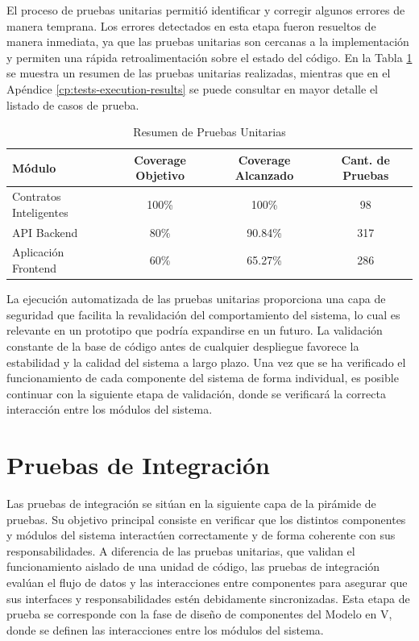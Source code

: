 El proceso de pruebas unitarias permitió identificar y corregir algunos errores de manera temprana. Los errores detectados en esta etapa fueron resueltos de manera inmediata, ya que las pruebas unitarias son cercanas a la implementación y permiten una rápida retroalimentación sobre el estado del código. En la Tabla \ref{tab:unit-testing-summary} se muestra un resumen de las pruebas unitarias realizadas, mientras que en el Apéndice \ref{cp:tests-execution-results} se puede consultar en mayor detalle el listado de casos de prueba.


\begin{table}[!htb]
\centering
\caption{Resumen de Pruebas Unitarias}
\label{tab:unit-testing-summary}
\begin{tabular}{|l|c|c|c|}
\hline
\textbf{Módulo} & \textbf{Coverage Objetivo} & \textbf{Coverage Alcanzado} & \textbf{Cant. de Pruebas} \\
\hline
Contratos Inteligentes & 100\% & 100\% & 98 \\
API Backend & 80\% & 90.84\% & 317 \\
Aplicación Frontend & 60\% & 65.27\% & 286 \\
\hline
\end{tabular}
\end{table}

La ejecución automatizada de las pruebas unitarias proporciona una capa de seguridad que facilita la revalidación del comportamiento del sistema, lo cual es relevante en un prototipo que podría expandirse en un futuro. La validación constante de la base de código antes de cualquier despliegue favorece la estabilidad y la calidad del sistema a largo plazo. Una vez que se ha verificado el funcionamiento de cada componente del sistema de forma individual, es posible continuar con la siguiente etapa de validación, donde se verificará la correcta interacción entre los módulos del sistema.

\section{Pruebas de Integración}
\label{sec:integration-testing}

Las pruebas de integración se sitúan en la siguiente capa de la pirámide de pruebas. Su objetivo principal consiste en verificar que los distintos componentes y módulos del sistema interactúen correctamente y de forma coherente con sus responsabilidades. A diferencia de las pruebas unitarias, que validan el funcionamiento aislado de una unidad de código, las pruebas de integración evalúan el flujo de datos y las interacciones entre componentes para asegurar que sus interfaces y responsabilidades estén debidamente sincronizadas. Esta etapa de prueba se corresponde con la fase de diseño de componentes del Modelo en V, donde se definen las interacciones entre los módulos del sistema.

